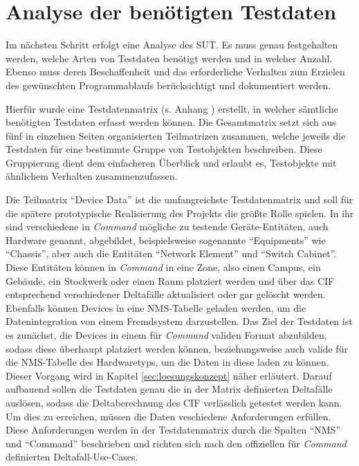 \section{Analyse der benötigten Testdaten}\label{sec:testdatenanalyse}
Im nächsten Schritt erfolgt eine Analyse des \acf{SUT}. Es muss genau festgehalten werden, welche Arten von Testdaten benötigt werden und in welcher Anzahl. Ebenso muss deren Beschaffenheit und das erforderliche Verhalten zum Erzielen des gewünschten Programmablaufs berücksichtigt und dokumentiert werden. 

Hierfür wurde eine Testdatenmatrix (s. Anhang ) erstellt, in welcher sämtliche benötigten Testdaten erfasst werden können. Die Gesamtmatrix setzt sich aus fünf in einzelnen Seiten organisierten Teilmatrizen zusammen, welche jeweils die Testdaten für eine bestimmte Gruppe von Testobjekten beschreiben. Diese Gruppierung dient dem einfacheren Überblick und erlaubt es, Testobjekte mit ähnlichem Verhalten zusammenzufassen.

Die Teilmatrix \enquote{Device Data} ist die umfangreichste Testdatenmatrix und soll für die spätere prototypische Realisierung des Projekts die größte Rolle spielen. In ihr sind verschiedene in \textit{Command} mögliche zu testende Geräte-Entitäten, auch Hardware genannt, abgebildet, beispielsweise sogenannte \enquote{Equipments} wie \enquote{Chassis}, aber auch die Entitäten \enquote{Network Element} und \enquote{Switch Cabinet}. Diese Entitäten können in \textit{Command} in eine Zone, also einen Campus, ein Gebäude, ein Stockwerk oder einen Raum platziert werden und über das \ac{CIF} entsprechend verschiedener Deltafälle aktualisiert oder gar gelöscht werden. Ebenfalls können Devices in eine \ac{NMS}-Tabelle geladen werden, um die Datenintegration von einem Fremdsystem darzustellen. Das Ziel der Testdaten ist es zunächst, die Devices in einem für \textit{Command} validen Format abzubilden, sodass diese überhaupt platziert werden können, beziehungsweise auch valide für die \ac{NMS}-Tabelle des Hardwaretyps, um die Daten in diese laden zu können. Dieser Vorgang wird in Kapitel \ref{sec:loesungskonzept} näher erläutert. Darauf aufbauend sollen die Testdaten genau die in der Matrix definierten Deltafälle auslösen, sodass die Deltaberechnung des \ac{CIF} verlässlich getestet werden kann. Um dies zu erreichen, müssen die Daten veschiedene Anforderungen erfüllen. Diese Anforderungen werden in der Testdatenmatrix durch die Spalten \enquote{NMS} und \enquote{Command} beschrieben und richten sich nach den offiziellen für \textit{Command} definierten Deltafall-Use-Cases. \cite{fntusecases:2022}

